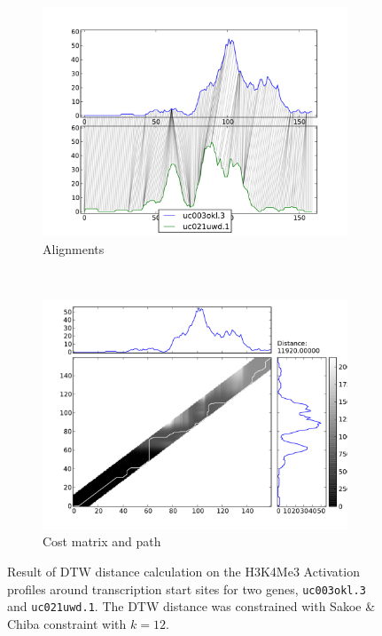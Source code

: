 \documentclass[parskip]{cs4rep}
\newcommand{\gene}[1]{{\tt #1}}
\newcommand{\histonemodification}[1]{#1}
\begin{document}
\begin{figure}
   \centering
   \begin{subfigure}[b]{0.45\textwidth}
       \centering
       \includegraphics[width=\textwidth]{figures/DTW/uc003okl_3-uc021uwd_1-mappings-sakoe-chiba.pdf}
       \caption{Alignments}
       \label{fig:DTW:sakoe_chiba:mappings}
   \end{subfigure}
   ~
   \begin{subfigure}[b]{0.45\textwidth}
       \centering
       \includegraphics[width=\textwidth]{figures/DTW/uc003okl_3-uc021uwd_1-cost-sakoe-chiba.pdf}
       \caption{Cost matrix and path}
       \label{fig:DTW:sakoe_chiba:cost}
   \end{subfigure}
   \caption{Result of DTW distance calculation on the \histonemodification{H3K4Me3} Activation profiles around transcription start sites for two genes, \gene{uc003okl.3} and \gene{uc021uwd.1}. The DTW distance was constrained with Sakoe & Chiba constraint with $k = 12$.}
   \label{fig:DTW:sakoe_chiba}
\end{figure}
\end{document}
